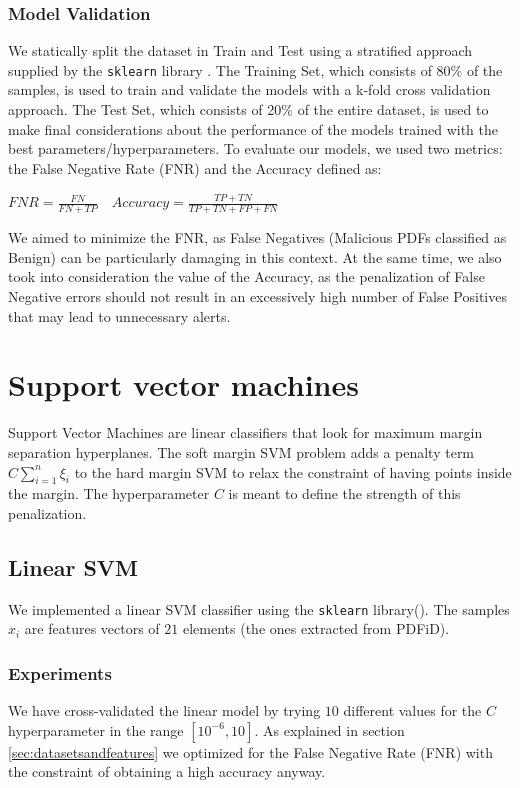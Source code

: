\documentclass[twocolumn, switch]{article} %
\begin{document}
\subsubsection{Model Validation}
We statically split the dataset in Train and Test using a stratified approach supplied by the \texttt{sklearn} library \cite{scikit-learn}. The Training Set, which consists of 80\% of the samples, is used to train and validate the models with a k-fold cross validation approach. The Test Set, which consists of 20\% of the entire dataset, is used to make final considerations about the performance of the models trained with the best parameters/hyperparameters.
To evaluate our models, we used two metrics: the False Negative Rate (FNR) and the Accuracy defined as:
\begin{center}
	$FNR = \frac{FN}{FN + TP} \quad Accuracy = \frac{TP+TN}{TP+TN+FP+FN}$
\end{center}
We aimed to minimize the FNR, as False Negatives (Malicious PDFs classified as Benign) can be particularly damaging in this context.
At the same time, we also took into consideration the value of the Accuracy, as the penalization of False Negative errors should not result in an excessively high number of False Positives that may lead to unnecessary alerts.

\section{Support vector machines}
\label{sec:svm}
Support Vector Machines are linear classifiers that look for maximum margin separation hyperplanes.
The soft margin SVM problem adds a penalty term $C\sum_{i=1}^{n}\xi_i$ to the hard margin SVM to relax the constraint of having points inside the margin. The hyperparameter $C$ is meant to define the strength of this penalization.
\subsection{Linear SVM}
We implemented a linear SVM classifier using the \texttt{sklearn} library(\cite{scikit-learn}). The samples $x_i$ are features vectors of $21$ elements (the ones extracted from PDFiD).

\subsubsection{Experiments}
We have cross-validated the linear model by trying $10$ different values for the $C$ hyperparameter in the range $[10^{-6}, 10]$. As explained in section \ref{sec:datasetsandfeatures} we optimized for the False Negative Rate (FNR) with the constraint of obtaining a high accuracy anyway.
\end{document}
